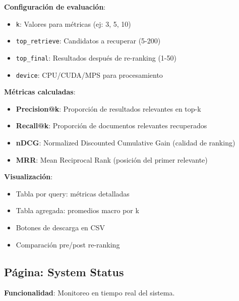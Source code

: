 \documentclass[12pt,a4paper]{article}
\begin{document}
\textbf{Configuración de evaluación}:
\begin{itemize}
    \item \texttt{k}: Valores para métricas (ej: 3, 5, 10)
    \item \texttt{top\_retrieve}: Candidatos a recuperar (5-200)
    \item \texttt{top\_final}: Resultados después de re-ranking (1-50)
    \item \texttt{device}: CPU/CUDA/MPS para procesamiento
\end{itemize}

\textbf{Métricas calculadas}:
\begin{itemize}
    \item \textbf{Precision@k}: Proporción de resultados relevantes en top-k
    \item \textbf{Recall@k}: Proporción de documentos relevantes recuperados
    \item \textbf{nDCG}: Normalized Discounted Cumulative Gain (calidad de ranking)
    \item \textbf{MRR}: Mean Reciprocal Rank (posición del primer relevante)
\end{itemize}

\textbf{Visualización}:
\begin{itemize}
    \item Tabla por query: métricas detalladas
    \item Tabla agregada: promedios macro por k
    \item Botones de descarga en CSV
    \item Comparación pre/post re-ranking
\end{itemize}

\subsection{Página: System Status}

\textbf{Funcionalidad}: Monitoreo en tiempo real del sistema.
\end{document}
